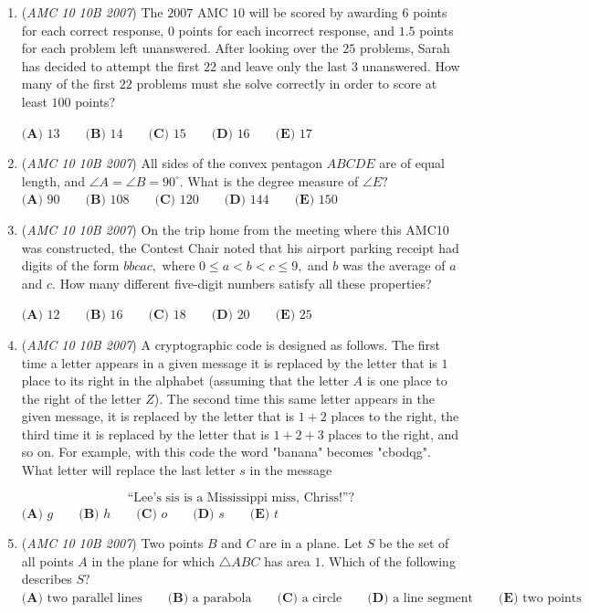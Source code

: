 \begin{enumerate}
	\item (\textit{AMC 10 10B 2007}) The $2007$ $\text{AMC}$ $10$ will be scored by awarding $6$ points for each correct response, $0$ points for each incorrect response, and $1.5$ points for each problem left unanswered. After looking over the $25$ problems, Sarah has decided to attempt the first $22$ and leave only the last $3$ unanswered. How many of the first $22$ problems must she solve correctly in order to score at least $100$ points?


 $\textbf{(A) } 13 \qquad\textbf{(B) } 14 \qquad\textbf{(C) } 15 \qquad\textbf{(D) } 16 \qquad\textbf{(E) } 17$


	\item (\textit{AMC 10 10B 2007}) All sides of the convex pentagon $ABCDE$ are of equal length, and $\angle A= \angle B = 90^\circ.$ What is the degree measure of $\angle E?$
$\textbf{(A) } 90 \qquad\textbf{(B) } 108 \qquad\textbf{(C) } 120 \qquad\textbf{(D) } 144 \qquad\textbf{(E) } 150$


	\item (\textit{AMC 10 10B 2007}) On the trip home from the meeting where this AMC10 was constructed, the Contest Chair noted that his airport parking receipt had digits of the form $bbcac,$ where $0 \le a < b < c \le 9,$ and $b$ was the average of $a$ and $c.$ How many different five-digit numbers satisfy all these properties?


 $\textbf{(A) } 12 \qquad\textbf{(B) } 16 \qquad\textbf{(C) } 18 \qquad\textbf{(D) } 20 \qquad\textbf{(E) } 25$


	\item (\textit{AMC 10 10B 2007}) A cryptographic code is designed as follows. The first time a letter appears in a given message it is replaced by the letter that is $1$ place to its right in the alphabet (assuming that the letter $A$ is one place to the right of the letter $Z$). The second time this same letter appears in the given message, it is replaced by the letter that is $1+2$ places to the right, the third time it is replaced by the letter that is $1+2+3$ places to the right, and so on. For example, with this code the word "banana" becomes "cbodqg". What letter will replace the last letter $s$ in the message

 \[\text{``Lee's sis is a Mississippi miss, Chriss!''?}\]
$\textbf{(A) } g \qquad\textbf{(B) } h \qquad\textbf{(C) } o \qquad\textbf{(D) } s \qquad\textbf{(E) } t$


	\item (\textit{AMC 10 10B 2007}) Two points $B$ and $C$ are in a plane. Let $S$ be the set of all points $A$ in the plane for which $\triangle ABC$ has area $1.$ Which of the following describes $S?$
$\textbf{(A) } \text{two parallel lines} \qquad\textbf{(B) } \text{a parabola} \qquad\textbf{(C) } \text{a circle} \qquad\textbf{(D) } \text{a line segment} \qquad\textbf{(E) } \text{two points}$



\end{enumerate}
